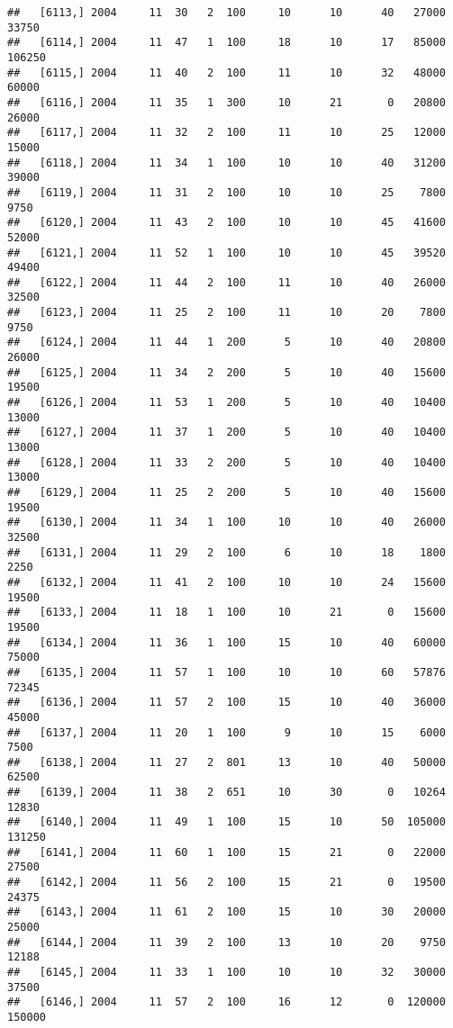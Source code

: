 \documentclass{article}\usepackage[]{graphicx}\usepackage[]{color}
\makeatletter
\newenvironment{kframe}{%
 \def\at@end@of@kframe{}%
 \ifinner\ifhmode%
  \def\at@end@of@kframe{\end{minipage}}%
  \begin{minipage}{\columnwidth}%
 \fi\fi%
 \def\FrameCommand##1{\hskip\@totalleftmargin \hskip-\fboxsep
 \colorbox{shadecolor}{##1}\hskip-\fboxsep
     \hskip-\linewidth \hskip-\@totalleftmargin \hskip\columnwidth}%
 \MakeFramed {\advance\hsize-\width
   \@totalleftmargin\z@ \linewidth\hsize
   \@setminipage}}%
 {\par\unskip\endMakeFramed%
 \at@end@of@kframe}
\newenvironment{knitrout}{}{} %
\makeatother
\begin{document}
\begin{knitrout}
\begin{kframe}
\begin{verbatim}
##   [6113,] 2004     11  30   2  100     10      10      40   27000   33750
##   [6114,] 2004     11  47   1  100     18      10      17   85000  106250
##   [6115,] 2004     11  40   2  100     11      10      32   48000   60000
##   [6116,] 2004     11  35   1  300     10      21       0   20800   26000
##   [6117,] 2004     11  32   2  100     11      10      25   12000   15000
##   [6118,] 2004     11  34   1  100     10      10      40   31200   39000
##   [6119,] 2004     11  31   2  100     10      10      25    7800    9750
##   [6120,] 2004     11  43   2  100     10      10      45   41600   52000
##   [6121,] 2004     11  52   1  100     10      10      45   39520   49400
##   [6122,] 2004     11  44   2  100     11      10      40   26000   32500
##   [6123,] 2004     11  25   2  100     11      10      20    7800    9750
##   [6124,] 2004     11  44   1  200      5      10      40   20800   26000
##   [6125,] 2004     11  34   2  200      5      10      40   15600   19500
##   [6126,] 2004     11  53   1  200      5      10      40   10400   13000
##   [6127,] 2004     11  37   1  200      5      10      40   10400   13000
##   [6128,] 2004     11  33   2  200      5      10      40   10400   13000
##   [6129,] 2004     11  25   2  200      5      10      40   15600   19500
##   [6130,] 2004     11  34   1  100     10      10      40   26000   32500
##   [6131,] 2004     11  29   2  100      6      10      18    1800    2250
##   [6132,] 2004     11  41   2  100     10      10      24   15600   19500
##   [6133,] 2004     11  18   1  100     10      21       0   15600   19500
##   [6134,] 2004     11  36   1  100     15      10      40   60000   75000
##   [6135,] 2004     11  57   1  100     10      10      60   57876   72345
##   [6136,] 2004     11  57   2  100     15      10      40   36000   45000
##   [6137,] 2004     11  20   1  100      9      10      15    6000    7500
##   [6138,] 2004     11  27   2  801     13      10      40   50000   62500
##   [6139,] 2004     11  38   2  651     10      30       0   10264   12830
##   [6140,] 2004     11  49   1  100     15      10      50  105000  131250
##   [6141,] 2004     11  60   1  100     15      21       0   22000   27500
##   [6142,] 2004     11  56   2  100     15      21       0   19500   24375
##   [6143,] 2004     11  61   2  100     15      10      30   20000   25000
##   [6144,] 2004     11  39   2  100     13      10      20    9750   12188
##   [6145,] 2004     11  33   1  100     10      10      32   30000   37500
##   [6146,] 2004     11  57   2  100     16      12       0  120000  150000

\end{verbatim}
\end{kframe}
\end{knitrout}
\end{document}
